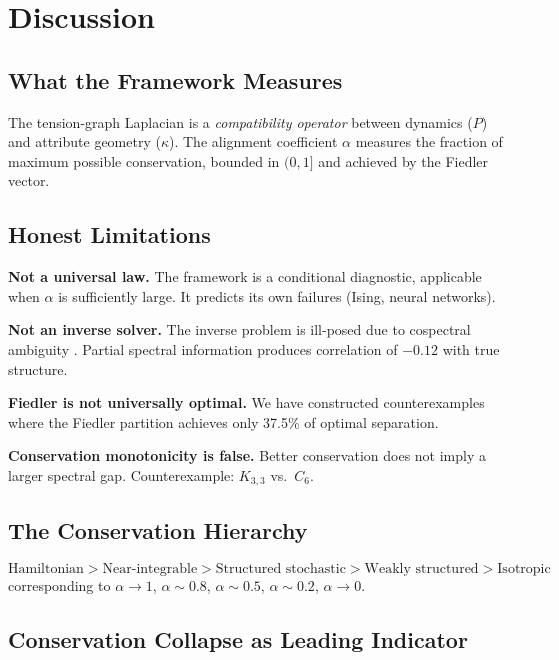 \documentclass[12pt,letterpaper]{article}
\begin{document}
\section{Discussion}
\label{sec:discussion}

\subsection{What the Framework Measures}

The tension-graph Laplacian is a \emph{compatibility operator} between dynamics ($P$) and attribute geometry ($\kappa$). The alignment coefficient $\alpha$ measures the fraction of maximum possible conservation, bounded in $(0, 1]$ and achieved by the Fiedler vector.

\subsection{Honest Limitations}

\textbf{Not a universal law.} The framework is a conditional diagnostic, applicable when $\alpha$ is sufficiently large. It predicts its own failures (Ising, neural networks).

\textbf{Not an inverse solver.} The inverse problem is ill-posed due to cospectral ambiguity \citep{vandam2003}. Partial spectral information produces correlation of $-0.12$ with true structure.

\textbf{Fiedler is not universally optimal.} We have constructed counterexamples where the Fiedler partition achieves only 37.5\% of optimal separation.

\textbf{Conservation monotonicity is false.} Better conservation does not imply a larger spectral gap. Counterexample: $K_{3,3}$ vs.\ $C_6$.

\subsection{The Conservation Hierarchy}

\[
  \text{Hamiltonian} > \text{Near-integrable} > \text{Structured stochastic} > \text{Weakly structured} > \text{Isotropic}
\]
corresponding to $\alpha \to 1$, $\alpha \sim 0.8$, $\alpha \sim 0.5$, $\alpha \sim 0.2$, $\alpha \to 0$.

\subsection{Conservation Collapse as Leading Indicator}
\end{document}
